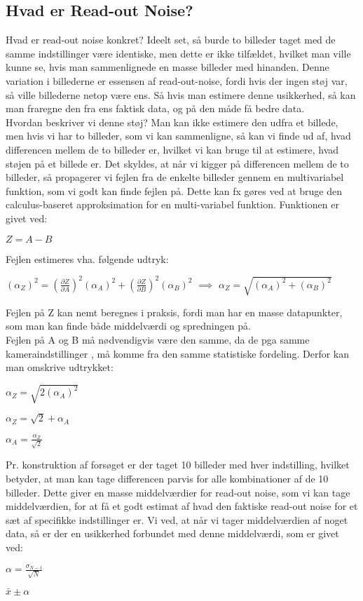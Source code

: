 \documentclass[working]{tuftebook}
\begin{document}
\subsection{Hvad er Read-out Noise?}
Hvad er read-out noise konkret? Ideelt set, så burde to billeder taget med de samme indstillinger være identiske, men dette er ikke tilfældet, hvilket man ville kunne se, hvis man sammenlignede en masse billeder med hinanden. Denne variation i billederne er essensen af read-out-noise, fordi hvis der ingen støj var, så ville billederne netop være ens. Så hvis man estimere denne usikkerhed, så kan man fraregne den fra ens faktisk data, og på den måde få bedre data. 
\\
Hvordan beskriver vi denne støj? Man kan ikke estimere den udfra et billede, men hvis vi har to billeder, som vi kan sammenligne, så kan vi finde ud af, hvad differencen mellem de to billeder er, hvilket vi kan bruge til at estimere, hvad støjen på et billede er. Det skyldes, at når vi kigger på differencen mellem de to billeder, så propagerer vi fejlen fra de enkelte billeder gennem en multivariabel funktion, som vi godt kan finde fejlen på. 
Dette kan fx gøres ved at bruge den calculus-baseret approksimation for en multi-variabel funktion. Funktionen er givet ved:
\begin{center}
$Z=A-B$
\end{center}
Fejlen estimeres vha. følgende udtryk:
\begin{center}
$(\alpha_Z)^2=(\frac{\partial Z}{\partial A})^2(\alpha_A)^2+(\frac{\partial Z}{\partial B})^2(\alpha_B)^2$
$\implies$
$\alpha_Z=\sqrt{(\alpha_A)^2+(\alpha_B)^2}$
\end{center}

Fejlen på Z kan nemt beregnes i praksis, fordi man har en masse datapunkter, som man kan finde både middelværdi og spredningen på.
\\
Fejlen på A og B må nødvendigvis være den samme, da de pga samme kameraindstillinger , må komme fra den samme statistiske fordeling. Derfor kan man omskrive udtrykket:
\begin{center}
$\alpha_Z=\sqrt{2(\alpha_A)^2}$
\smallskip

$\alpha_Z=\sqrt{2}+\alpha_A  $
\smallskip

$\alpha_A=\frac{\alpha_Z}{\sqrt{2}}$
\end{center}
Pr. konstruktion af forsøget er der taget 10 billeder med hver indstilling, hvilket betyder, at man kan tage differencen parvis for alle kombinationer af de 10 billeder. Dette giver en masse middelværdier for read-out noise, som vi kan tage middelværdien, for at få et godt estimat af hvad den faktiske read-out noise for et sæt af specifikke indstillinger er. Vi ved, at når vi tager middelværdien af noget data, så er der en usikkerhed forbundet med denne middelværdi, som er givet ved:
\begin{center}
$\alpha = \frac{\sigma_{N-1}}{\sqrt{N}}$
\smallskip

$\bar{x}\pm \alpha$
\end{center}
\end{document}
